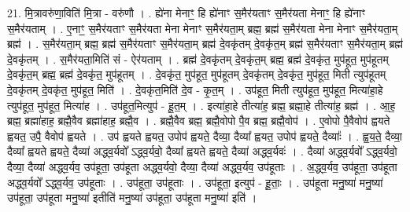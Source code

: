 \documentclass[17pt]{extarticle}
\begin{document}
21. मि॒त्रावरु॑णा॒विति॑ मि॒त्रा - वरु॑णौ । . ह्ये॑ना मेनाꣳ॒॒ हि ह्ये॑नाꣳ स॒मैर॑यताꣳ स॒मैर॑यता मेनाꣳ॒॒ हि ह्ये॑नाꣳ स॒मैर॑यताम् । . ए॒नाꣳ॒॒ स॒मैर॑यताꣳ स॒मैर॑यता मेना मेनाꣳ स॒मैर॑यता॒म् ब्रह्म॒ ब्रह्म॑ स॒मैर॑यता मेना मेनाꣳ स॒मैर॑यता॒म् ब्रह्म॑ । . स॒मैर॑यता॒म् ब्रह्म॒ ब्रह्म॑ स॒मैर॑यताꣳ स॒मैर॑यता॒म् ब्रह्म॑ दे॒वकृ॑तम् दे॒वकृ॑त॒म् ब्रह्म॑ स॒मैर॑यताꣳ स॒मैर॑यता॒म् ब्रह्म॑ दे॒वकृ॑तम् । . स॒मैर॑यता॒मिति॑ सं - ऐर॑यताम् । . ब्रह्म॑ दे॒वकृ॑तम् दे॒वकृ॑त॒म् ब्रह्म॒ ब्रह्म॑ दे॒वकृ॑त॒ मुप॑हूत॒ मुप॑हूतम् दे॒वकृ॑त॒म् ब्रह्म॒ ब्रह्म॑ दे॒वकृ॑त॒ मुप॑हूतम् । . दे॒वकृ॑त॒ मुप॑हूत॒ मुप॑हूतम् दे॒वकृ॑तम् दे॒वकृ॑त॒ मुप॑हूत॒ मिती त्युप॑हूतम् दे॒वकृ॑तम् दे॒वकृ॑त॒ मुप॑हूत॒ मिति॑ । . दे॒वकृ॑त॒मिति॑ दे॒व - कृ॒त॒म् । . उप॑हूत॒ मिती त्युप॑हूत॒ मुप॑हूत॒ मित्या॑हा॒हे त्युप॑हूत॒ मुप॑हूत॒ मित्या॑ह । . उप॑हूत॒मित्युप॑ - हू॒त॒म् । . इत्या॑हा॒हे तीत्या॑ह॒ ब्रह्म॒ ब्रह्मा॒हे तीत्या॑ह॒ ब्रह्म॑ । . आ॒ह॒ ब्रह्म॒ ब्रह्मा॑हाह॒ ब्रह्मै॒वैव ब्रह्मा॑हाह॒ ब्रह्मै॒व । . ब्रह्मै॒वैव ब्रह्म॒ ब्रह्मै॒वोपो पै॒व ब्रह्म॒ ब्रह्मै॒वोप॑ । . ए॒वोपो पै॒वैवोप॑ ह्वयते ह्वयत॒ उपै॒ वैवोप॑ ह्वयते । . उप॑ ह्वयते ह्वयत॒ उपोप॑ ह्वयते॒ दैव्या॒ दैव्या᳚ ह्वयत॒ उपोप॑ ह्वयते॒ दैव्याः᳚ । . ह्व॒य॒ते॒ दैव्या॒ दैव्या᳚ ह्वयते ह्वयते॒ दैव्या॑ अद्ध्व॒र्यवो᳚ ऽद्ध्व॒र्यवो॒ दैव्या᳚ ह्वयते ह्वयते॒ दैव्या॑ अद्ध्व॒र्यवः॑ । . दैव्या॑ अद्ध्व॒र्यवो᳚ ऽद्ध्व॒र्यवो॒ दैव्या॒ दैव्या॑ अद्ध्व॒र्यव॒ उप॑हूता॒ उप॑हूता अद्ध्व॒र्यवो॒ दैव्या॒ दैव्या॑ अद्ध्व॒र्यव॒ उप॑हूताः । . अ॒द्ध्व॒र्यव॒ उप॑हूता॒ उप॑हूता अद्ध्व॒र्यवो᳚ ऽद्ध्व॒र्यव॒ उप॑हूताः । . उप॑हूता॒ उप॑हूताः । . उप॑हूता॒ इत्युप॑ - हू॒ताः॒ । . उप॑हूता मनु॒ष्या॑ मनु॒ष्या॑ उप॑हूता॒ उप॑हूता मनु॒ष्या॑ इतीति॑ मनु॒ष्या॑ उप॑हूता॒ उप॑हूता मनु॒ष्या॑ इति॑ । \newline
\end{document}
